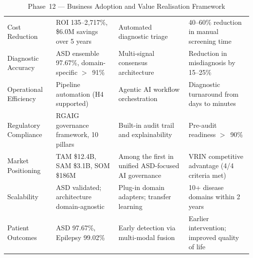 \begingroup\singlespacing\tablefontsize\tablestripes
\begin{xltabular}{\textwidth}{@{} p{0.18\textwidth} X X X @{}}
\caption{Phase~12 --- Business Adoption and Value Realisation Framework}
\label{tab:phase12_business_adoption}\\
\toprule
{} &  &  &  \\
\midrule
\endfirsthead
\endhead
\bottomrule
\endlastfoot
Cost Reduction            & ROI 135--2{,}717\%, \$6.0M savings over 5 years                                          & Automated diagnostic triage                                              & 40--60\% reduction in manual screening time \\
\addlinespace
Diagnostic Accuracy       & ASD ensemble 97.67\%, domain-specific $>$~91\%                                           & Multi-signal consensus architecture                                      & Reduction in misdiagnosis by 15--25\% \\
\addlinespace
Operational Efficiency    & Pipeline automation (H4 supported)                                              & Agentic AI workflow orchestration                                        & Diagnostic turnaround from days to minutes \\
\addlinespace
Regulatory Compliance     & RGAIG governance framework, 10 pillars                                          & Built-in audit trail and explainability                                  & Pre-audit readiness $>$~90\% \\
\addlinespace
Market Positioning        & TAM \$12.4B, SAM \$3.1B, SOM \$186M                                            & Among the first in unified ASD-focused AI governance                        & VRIN competitive advantage (4/4 criteria met) \\
\addlinespace
Scalability               & ASD validated; architecture domain-agnostic                               & Plug-in domain adapters; transfer learning                               & 10+ disease domains within 2 years \\
\addlinespace
Patient Outcomes          & ASD 97.67\%, Epilepsy 99.02\%                                         & Early detection via multi-modal fusion                                   & Earlier intervention; improved quality of life \\
\end{xltabular}
\endgroup

